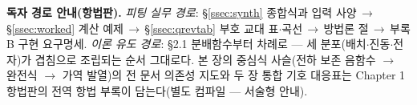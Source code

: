 \tableofcontents

\ifnavaid
\begin{keybox}
\textbf{독자 경로 안내(항법판).} \emph{피팅 실무 경로}: \S\ref{ssec:synth} 종합식과 입력
사양$\,\to\,$\S\ref{ssec:worked} 계산 예제$\,\to\,$\S\ref{ssec:qrevtab} 부호 교대
표$\cdot$곡선$\,\to\,$방법론 절$\,\to\,$부록 B 구현 요구명세. \emph{이론 유도 경로}: \S2.1 분배함수부터
차례로 --- 세 분포(배치$\cdot$진동$\cdot$전자)가 겹침으로 조립되는 순서 그대로다. 본 장의 중심식
사슬(전하 보존 음함수 $\to$ 완전식 $\to$ 가역 발열)의 전 문서 의존성 지도와 두 장 통합 기호 대응표는
Chapter 1 항법판의 전역 항법 부록이 담는다(별도 컴파일 --- 서술형 안내).
\end{keybox}
\fi

